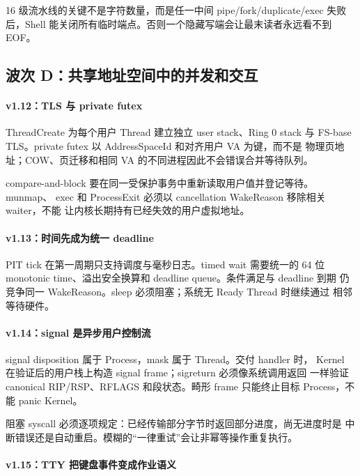 16 级流水线的关键不是字符数量，而是任一中间 pipe/fork/duplicate/exec
失败后，Shell 能关闭所有临时端点。否则一个隐藏写端会让最末读者永远看不到
EOF。

\subsection{波次 D：共享地址空间中的并发和交互}

\paragraph{v1.12：TLS 与 private futex}

ThreadCreate 为每个用户 Thread 建立独立 user stack、Ring 0 stack 与
FS-base TLS。private futex 以 AddressSpaceId 和对齐用户 VA 为键，而不是
物理页地址；COW、页迁移和相同 VA 的不同进程因此不会错误合并等待队列。

compare-and-block 要在同一受保护事务中重新读取用户值并登记等待。munmap、
exec 和 ProcessExit 必须以 cancellation WakeReason 移除相关 waiter，不能
让内核长期持有已经失效的用户虚拟地址。

\paragraph{v1.13：时间先成为统一 deadline}

PIT tick 在第一周期只支持调度与毫秒日志。timed wait 需要统一的 64 位
monotonic time、溢出安全换算和 deadline queue。条件满足与 deadline 到期
仍竞争同一 WakeReason。sleep 必须阻塞；系统无 Ready Thread 时继续通过
相邻  等待硬件。

\paragraph{v1.14：signal 是异步用户控制流}

signal disposition 属于 Process，mask 属于 Thread。交付 handler 时，
Kernel 在验证后的用户栈上构造 signal frame；sigreturn 必须像系统调用返回
一样验证 canonical RIP/RSP、RFLAGS 和段状态。畸形 frame 只能终止目标
Process，不能 panic Kernel。

阻塞 syscall 必须逐项规定：已经传输部分字节时返回部分进度，尚无进度时是
中断错误还是自动重启。模糊的“一律重试”会让非幂等操作重复执行。

\paragraph{v1.15：TTY 把键盘事件变成作业语义}

